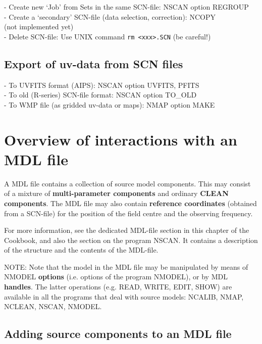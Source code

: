 - Create new `Job' from Sets in the same SCN-file: NSCAN option REGROUP\\ 
- Create a `secondary' SCN-file (data selection, correction): NCOPY\\ 
  (not implemented yet)\\ 
- Delete SCN-file: Use UNIX command {\tt rm <xxx>.SCN} (be careful!)\\ 

\subsection{Export of uv-data from SCN files} 
\label{scn.export} 

- To UVFITS format (AIPS): NSCAN option UVFITS, PFITS\\ 
- To old (R-series) SCN-file format: NSCAN option TO\_OLD\\ 
- To WMP file (as gridded uv-data or maps): NMAP option MAKE\\ 



\section{Overview of interactions with an MDL file} 
\label{mdl.inter} 

	A MDL file contains a collection of source model components. 
This may consist of a mixture of {\bf multi-parameter components} and ordinary
{\bf CLEAN components}.  The MDL file may also contain {\bf reference
coordinates} (obtained from a SCN-file) for the position of the field centre
and the observing frequency. 

	For more information, see the dedicated MDL-file section in this
chapter of the Cookbook, and also the section on the program NSCAN.  It
contains a description of the structure and the contents of the 
MDL-file. 

	NOTE: Note that the model in the MDL file may be manipulated by means
of NMODEL {\bf options} (i.e.  options of the program NMODEL), or by MDL {\bf
handles}.  The latter operations (e.g.  READ, WRITE, EDIT, 
SHOW) are available in all the programs that deal with source models: 
NCALIB, NMAP, NCLEAN, NSCAN, NMODEL.

\subsection{Adding source components to an MDL file} 
\label{mdl.generate} 

